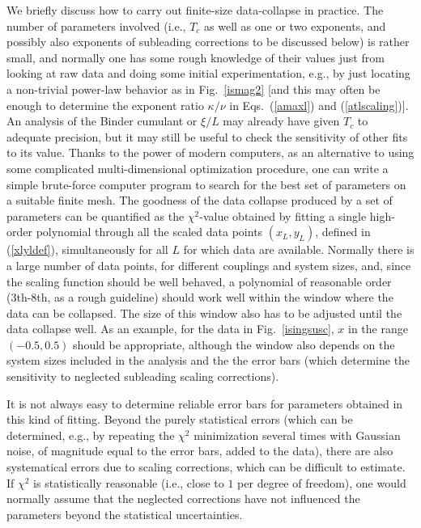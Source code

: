 \documentclass[draft,numberedheadings]{aipproc}
\begin{document}
We briefly discuss how to carry out finite-size  data-collapse in practice. The number of parameters involved (i.e., $T_c$ as well
as one or two exponents, and possibly also exponents of subleading corrections to be discussed below) is rather small, and normally one has some rough knowledge of 
their values just from looking at raw data and doing some initial experimentation, e.g., by just locating a non-trivial power-law behavior as in Fig.~\ref{ismag2} 
[and this may often be enough to determine the exponent ratio $\kappa/\nu$ in Eqs.~(\ref{amaxl}) and (\ref{atlscaling})]. An analysis of the Binder cumulant or 
$\xi/L$ may already have given $T_c$ to adequate precision, but it may still be useful to check the sensitivity of other fits to its value. Thanks to the power 
of modern computers, as an alternative to using some complicated multi-dimensional optimization procedure, one can write a simple brute-force computer program to 
search for the best set of parameters on a suitable finite mesh. The goodness of the data collapse produced by a set of parameters can be
quantified as the $\chi^2$-value obtained by fitting a single high-order polynomial through all the scaled data points $(x_L,y_L)$, defined in (\ref{xlyldef}), 
simultaneously for all $L$ for which data are available. Normally there is a large number of data points, for different couplings and system sizes, and, since 
the scaling function should be well behaved, a polynomial of reasonable order (3th-8th, as a rough guideline) should work well within the window where the data can 
be collapsed. The size of this window also has to be adjusted until the data collapse well. As an example, for the data in Fig.~\ref{isingsusc}, $x$ in the range 
$(-0.5,0.5)$ should be appropriate, although the window also depends on the system sizes included in the analysis and the the error bars (which determine the 
sensitivity to neglected subleading scaling corrections). 

It is not always easy to determine reliable error bars for parameters obtained in this kind of fitting. Beyond the purely statistical errors (which can 
be determined, e.g., by repeating the $\chi^2$ minimization several times with Gaussian noise, of magnitude equal to the error bars, added to the data), 
there are also systematical errors due to scaling corrections, which can be difficult to estimate. If $\chi^2$ is statistically reasonable (i.e., close 
to $1$ per degree of freedom), one would normally assume that the neglected corrections have not influenced the parameters beyond the statistical uncertainties. 
\end{document}
